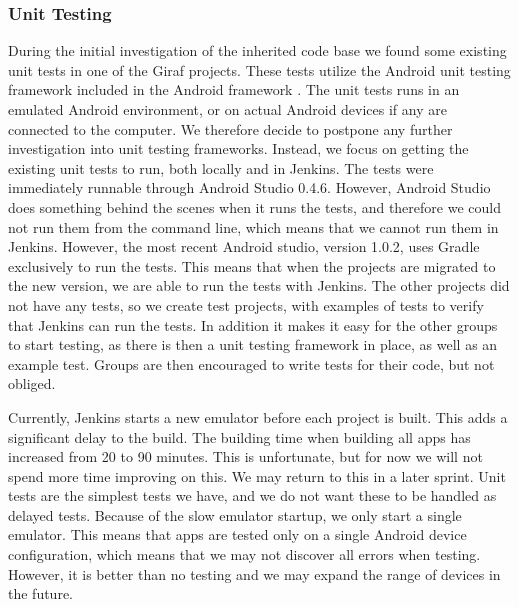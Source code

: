 \subsubsection{Unit Testing}
During the initial investigation of the inherited code base we found some existing unit tests in one of the Giraf projects. These tests utilize the Android unit testing framework included in the Android framework \parencite{AndroidUnit}. The unit tests runs in an emulated Android environment, or on actual Android devices if any are connected to the computer. We therefore decide to postpone any further investigation into unit testing frameworks. Instead, we focus on getting the existing unit tests to run, both locally and in Jenkins. The tests were immediately runnable through Android Studio 0.4.6. However, Android Studio does something behind the scenes when it runs the tests, and therefore we could not run them from the command line, which means that we cannot run them in Jenkins. However, the most recent Android studio, version 1.0.2, uses Gradle exclusively to run the tests. This means that when the projects are migrated to the new version, we are able to run the tests with Jenkins.
The other projects did not have any tests, so we create test projects, with examples of tests to verify that Jenkins can run the tests. In addition it makes it easy for the other groups to start testing, as there is then a unit testing framework in place, as well as an example test. Groups are then encouraged to write tests for their code, but not obliged.

Currently, Jenkins starts a new emulator before each project is built. This adds a significant delay to the build. The building time when building all apps has increased from 20 to 90 minutes. This is unfortunate, but for now we will not spend more time improving on this. We may return to this in a later sprint. Unit tests are the simplest tests we have, and we do not want these to be handled as delayed tests. Because of the slow emulator startup, we only start a single emulator. This means that apps are tested only on a single Android device configuration, which means that we may not discover all errors when testing. However, it is better than no testing and we may expand the range of devices in the future.


